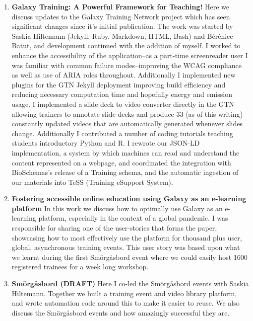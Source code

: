 \begin{enumerate}[label=\ref{chapter:training}.\arabic*]
\itemsep-0.5em
\setcounter{enumi}{-1}
\item \textbf{Galaxy Training: A Powerful Framework for Teaching!} Here we discuss updates to the Galaxy Training Network project which has seen significant changes since it's initial publication. The work was started by Saskia Hiltemann (Jekyll, Ruby, Markdown, HTML, Bash) and Bérénice Batut, and development continued with the addition of myself. I worked to enhance the accessibility of the application--as a part-time screenreader user I was familiar with common failure modes--improving the WCAG compliance as well as use of ARIA roles throughout. Additionally I implemented new plugins for the GTN Jekyll deployment improving build efficiency and reducing necessary computation time and hopefully energy and emission usage. I implemented a slide deck to video converter directly in the GTN allowing trainers to annotate slide decks and produce 33 (as of this writing) constantly updated videos that are automatically generated whenever slides change. Additionally I contributed a number of coding tutorials teaching students introductory Python and R. I rewrote our JSON-LD implementation, a system by which machines can read and understand the content represented on a webpage, and coordinated the integration with BioSchemas's release of a Training schema, and the automatic ingestion of our materials into TeSS (Training eSupport System).
\item \textbf{Fostering accessible online education using Galaxy as an e-learning platform} In this work we discuss how to optimally use Galaxy as an e-learning platform, especially in the context of a global pandemic. I was responsible for sharing one of the user-stories that forms the paper, showcasing how to most effectively use the platform for thousand plus user, global, asynchronous training events. This user story was based upon what we learnt during the first Smörgåsbord event where we could easily host 1600 registered trainees for a week long workshop.
\item \textbf{Smörgåsbord (DRAFT)} Here I co-led the Smörgåsbord events with Saskia Hiltemann. Together we built a training event and video library platform, and wrote automation code around this to make it easier to reuse. We also discuss the Smörgåsbord events and how amazingly successful they are.

\end{enumerate}

